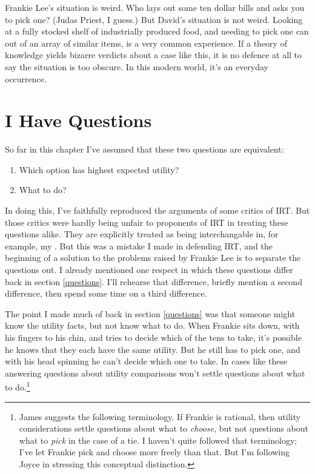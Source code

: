 \documentclass[11pt,]{book}
\providecommand{\tightlist}{%
  \setlength{\itemsep}{0pt}\setlength{\parskip}{0pt}}
\let\rmarkdownfootnote\footnote%
\def\footnote{\protect\rmarkdownfootnote}
\begin{document}
Frankie Lee's situation is weird. Who lays out some ten dollar bills and asks you to pick one? (Judas Priest, I guess.) But David's situation is not weird. Looking at a fully stocked shelf of industrially produced food, and needing to pick one can out of an array of similar items, is a very common experience. If a theory of knowledge yields bizarre verdicts about a case like this, it is no defence at all to say the situation is too obscure. In this modern world, it's an everyday occurrence.

\hypertarget{supermarketquestions}{%
\section{I Have Questions}\label{supermarketquestions}}

So far in this chapter I've assumed that these two questions are equivalent:

\begin{enumerate}
\def\labelenumi{\arabic{enumi}.}
\tightlist
\item
  Which option has highest expected utility?
\item
  What to do?
\end{enumerate}

In doing this, I've faithfully reproduced the arguments of some critics of IRT. But those critics were hardly being unfair to proponents of IRT in treating these questions alike. They are explicitly treated as being interchangable in, for example, my \citeyearpar{Weatherson2005}. But this was a mistake I made in defending IRT, and the beginning of a solution to the problems raised by Frankie Lee is to separate the questions out. I already mentioned one respect in which these questions differ back in section \ref{questions}. I'll rehearse that difference, briefly mention a second difference, then spend some time on a third difference.

The point I made much of back in section \ref{questions} was that someone might know the utility facts, but not know what to do. When Frankie sits down, with his fingers to his chin, and tries to decide which of the tens to take, it's possible he knows that they each have the same utility. But he still has to pick one, and with his head spinning he can't decide which one to take. In cases like these answering questions about utility comparisons won't settle questions about what to do.\footnote{James \citet{Joyce2018} suggests the following terminology. If Frankie is rational, then utility considerations settle questions about what to \emph{choose}, but not questions about what to \emph{pick} in the case of a tie. I haven't quite followed that terminology; I've let Frankie pick and choose more freely than that. But I'm following Joyce in stressing this conceptual distinction.}
\end{document}
